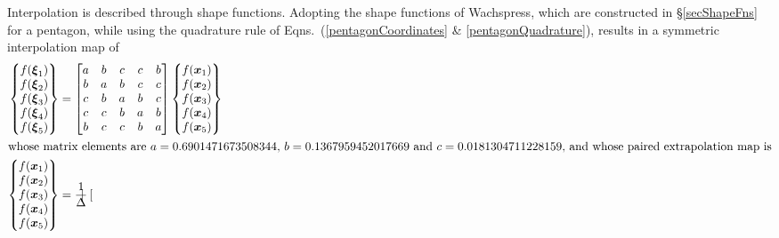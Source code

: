     Interpolation is described through shape functions.  Adopting the shape functions of Wachspress, which are constructed in \S\ref{secShapeFns} for a pentagon, while using the quadrature rule of Eqns.~(\ref{pentagonCoordinates} \& \ref{pentagonQuadrature}), results in a symmetric interpolation map of
    \begin{subequations}
        \label{extrapolationPentagon}
        \begin{align} 
        \left\{ \begin{matrix}
        f ( \boldsymbol{\xi}_1 ) \\ 
        f ( \boldsymbol{\xi}_2 ) \\ 
        f ( \boldsymbol{\xi}_3 ) \\ 
        f ( \boldsymbol{\xi}_4 ) \\ 
        f ( \boldsymbol{\xi}_5 )
        \end{matrix} \right\} & = \begin{bmatrix}
        a & b & c & c & b \\
        b & a & b & c & c \\
        c & b & a & b & c \\
        c & c & b & a & b \\
        b & c & c & b & a
        \end{bmatrix} 
        \left\{ \begin{matrix} 
        f ( \boldsymbol{x}_1 ) \\ 
        f ( \boldsymbol{x}_2 ) \\ 
        f ( \boldsymbol{x}_3 ) \\
        f ( \boldsymbol{x}_4 ) \\
        f ( \boldsymbol{x}_5 )
        \end{matrix} \right\} \\
        \intertext{whose matrix elements are $a = 0.6901471673508344$, $b = 0.1367959452017669$ and $c = 0.0181304711228159$, and whose paired extrapolation map is}
        \left\{ \begin{matrix} 
        f ( \boldsymbol{x}_1 ) \\ 
        f ( \boldsymbol{x}_2 ) \\ 
        f ( \boldsymbol{x}_3 ) \\
        f ( \boldsymbol{x}_4 ) \\
        f ( \boldsymbol{x}_5 )
        \end{matrix} \right\} & = \frac{1}{\Delta} \begin{bmatrix}

\end{bmatrix}
\end{align}
\end{subequations}
